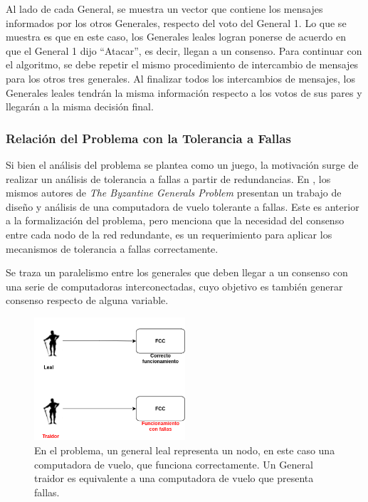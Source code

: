 Al lado de cada General, se muestra un vector que contiene los mensajes informados por los otros Generales, respecto del voto del General 1. Lo que se muestra es que en este caso, los Generales leales logran ponerse de acuerdo en que el General 1 dijo ``Atacar'', es decir, llegan a un consenso. Para continuar con el algoritmo, se debe repetir el mismo procedimiento de intercambio de mensajes para los otros tres generales. Al finalizar todos los intercambios de mensajes, los Generales leales tendrán la misma información respecto a los votos de sus pares y llegarán a la misma decisión final.

\subsubsection*{Relación del Problema con la Tolerancia a Fallas}

Si bien el análisis del problema se plantea como un juego, la motivación surge de realizar un análisis de tolerancia a fallas a partir de redundancias. En \cite{wensley1978sift}, los mismos autores de \textit{The Byzantine Generals Problem} presentan un trabajo de diseño y análisis de una computadora de vuelo tolerante a fallas. Este es anterior a la formalización del problema, pero menciona que la necesidad del consenso entre cada nodo de la red redundante, es un requerimiento para aplicar los mecanismos de tolerancia a fallas correctamente.

Se traza un paralelismo entre los generales que deben llegar a un consenso con una serie de computadoras interconectadas, cuyo objetivo es también generar consenso respecto de alguna variable.

\begin{figure}[H]
    \centering
    \includegraphics[width=0.5\textwidth]{img/Byzantine_Generals_Problem_4.png}
    \caption{En el problema, un general leal representa un nodo, en este caso una computadora de vuelo, que funciona correctamente. Un General traidor es equivalente a una computadora de vuelo que presenta fallas.}
    \label{fig:Byzantine_Generals_Problem_4}
\end{figure}

